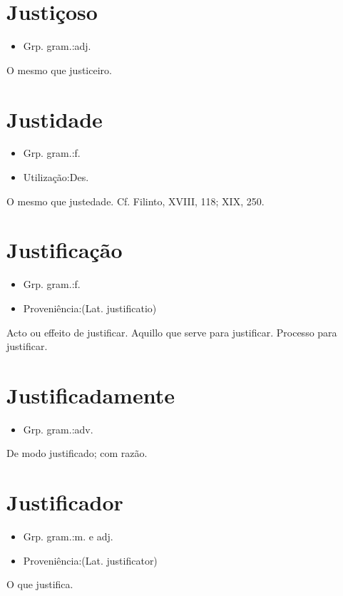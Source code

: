 \documentclass{article}
\begin{document}
\section{Justiçoso}
\begin{itemize}
\item {Grp. gram.:adj.}
\end{itemize}
O mesmo que \textunderscore justiceiro\textunderscore .
\section{Justidade}
\begin{itemize}
\item {Grp. gram.:f.}
\end{itemize}
\begin{itemize}
\item {Utilização:Des.}
\end{itemize}
O mesmo que \textunderscore justedade\textunderscore . Cf. Filinto, XVIII, 118; XIX, 250.
\section{Justificação}
\begin{itemize}
\item {Grp. gram.:f.}
\end{itemize}
\begin{itemize}
\item {Proveniência:(Lat. \textunderscore justificatio\textunderscore )}
\end{itemize}
Acto ou effeito de justificar.
Aquillo que serve para justificar.
Processo para justificar.
\section{Justificadamente}
\begin{itemize}
\item {Grp. gram.:adv.}
\end{itemize}
De modo justificado; com razão.
\section{Justificador}
\begin{itemize}
\item {Grp. gram.:m.  e  adj.}
\end{itemize}
\begin{itemize}
\item {Proveniência:(Lat. \textunderscore justificator\textunderscore )}
\end{itemize}
O que justifica.
\end{document}
